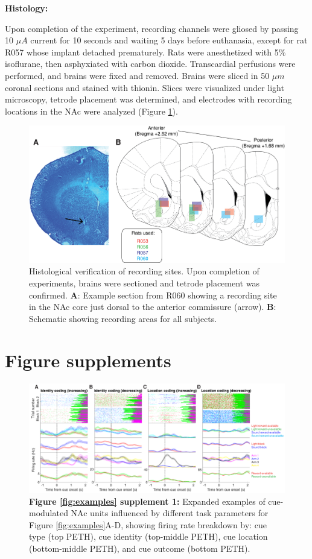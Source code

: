 \documentclass[11pt]{article}
\newcommand{\bsf}[1]{\textbf{#1}}
\begin{document}
{\bf Histology:}

Upon completion of the experiment, recording channels were gliosed by passing 10 $\mu A$ current for 10 seconds and waiting 5 days before euthanasia, except for rat R057 whose implant detached prematurely. Rats were anesthetized with 5\%
isoflurane, then asphyxiated with carbon dioxide. Transcardial
perfusions were performed, and brains were fixed and removed. Brains
were sliced in 50 $\mu m$ coronal sections and stained with
thionin. Slices were visualized under light microscopy, tetrode
placement was determined, and electrodes with recording locations in
the NAc were analyzed (Figure \ref{fig:histo}).

 \begin{figure}[ht!]
\centering
\includegraphics[width=\textwidth]{Fig 8 - Histology.png}
\caption{Histological verification of recording sites. Upon completion of
  experiments, brains were sectioned and tetrode placement was
  confirmed. \bsf{A}: Example section from R060 showing a recording site in the
  NAc core just dorsal to the anterior commissure (arrow). \bsf{B}:
  Schematic showing recording areas for all subjects.}
\label{fig:histo}
\end{figure} \clearpage

\section*{Figure supplements}

 \begin{figure}[ht!]
\centering
\includegraphics[width=\textwidth]{Fig 3 - Neural examples SUPP1.pdf}
\caption*{\bsf{Figure \ref{fig:examples} supplement 1:} Expanded examples of cue-modulated NAc units influenced by different
  task parameters for Figure \ref{fig:examples}A-D, showing firing rate breakdown by: cue type (top PETH), cue identity (top-middle PETH), cue location (bottom-middle PETH), and cue outcome (bottom PETH).}
\label{fig:examplesSUPP1}
\end{figure} \clearpage
\end{document}
